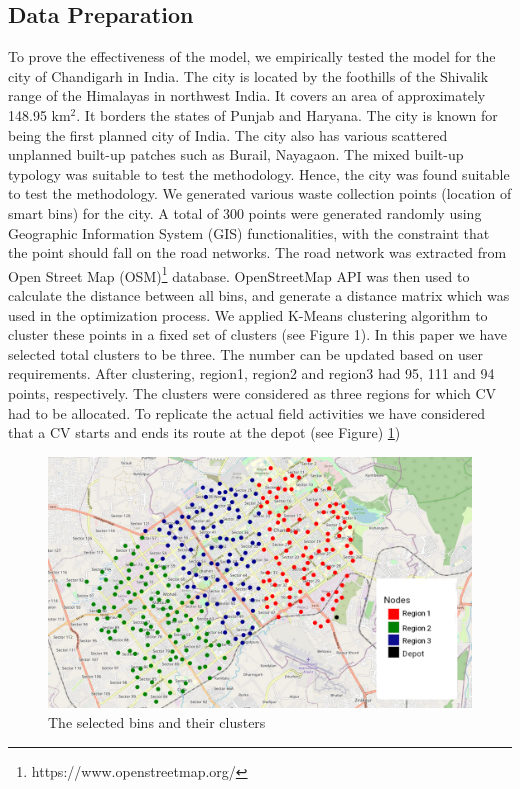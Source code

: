 \documentclass[12pt]{article}
\begin{document}
\subsection{Data Preparation}
To prove the effectiveness of the model, we empirically tested the model for the city of Chandigarh in India. The city is located by the foothills of the Shivalik range of the Himalayas in northwest India. It covers an area of approximately 148.95 km$^2$. It borders the states of Punjab and Haryana. The city is known for being the first planned city of India. The city also has various scattered unplanned built-up patches such as Burail, Nayagaon. The mixed built-up typology was suitable to test the methodology. Hence, the city was found suitable to test the methodology. We generated various waste collection points (location of smart bins) for the city. A total of 300 points were generated randomly using Geographic Information System (GIS) functionalities, with the constraint that the point should fall on the road networks. The road network was extracted from Open Street Map (OSM)\footnote{https://www.openstreetmap.org/} database. OpenStreetMap API was then used to calculate the distance between all bins, and generate a distance matrix which was used in the optimization process. We applied K-Means clustering algorithm to cluster these points in a fixed set of clusters (see Figure 1). In this paper we have selected total clusters to be three. The number can be updated based on user requirements. After clustering, region1, region2 and region3 had 95, 111 and 94 points, respectively. The clusters were considered as three regions for which CV had to be allocated. To replicate the actual field activities we have considered that a CV starts and ends its route at the depot (see Figure) \ref{figm})


\begin{figure}[H]
    \centering
    \includegraphics[scale=0.4]{Nodes.png}
    \caption{The selected bins and their clusters}\label{figm}
\end{figure}
\end{document}

